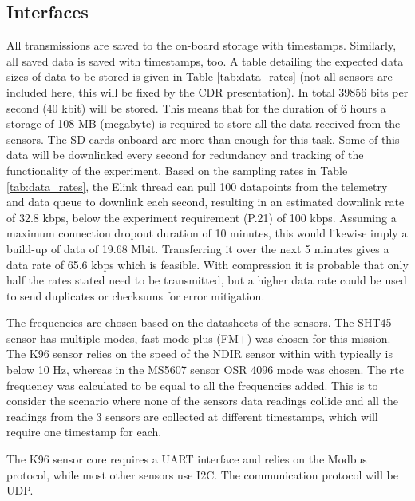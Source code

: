 \subsection{Interfaces}
All transmissions are saved to the on-board storage with timestamps. Similarly, all saved data is saved with timestamps, too. A table detailing the expected data sizes of data to be stored is given in Table \ref{tab:data_rates} (not all sensors are included here, this will be fixed by the CDR presentation). In total 39856 bits per second (40 kbit) will be stored. This means that for the duration of 6 hours a storage of 108 MB (megabyte) is required to store all the data received from the sensors. The SD cards onboard are more than enough for this task. Some of this data will be downlinked every second for redundancy and tracking of the functionality of the experiment. Based on the sampling rates in Table \ref{tab:data_rates}, the Elink thread can pull 100 datapoints from the telemetry and data queue to downlink each second, resulting in an estimated downlink rate of 32.8 kbps, below the experiment requirement (P.21) of 100 kbps. Assuming a maximum connection dropout duration of 10 minutes, this would likewise imply a build-up of data of 19.68 Mbit. Transferring it over the next 5 minutes gives a data rate of 65.6 kbps which is feasible. With compression it is probable that only half the rates stated need to be transmitted, but a higher data rate could be used to send duplicates or checksums for error mitigation.

The frequencies are chosen based on the datasheets of the sensors. The SHT45 sensor has multiple modes, fast mode plus (FM+) was chosen for this mission. The K96 sensor relies on the speed of the NDIR sensor within with typically is below 10 Hz, whereas in the MS5607 sensor OSR 4096 mode was chosen. The \gls{rtc} frequency was calculated to be equal to all the frequencies added. This is to consider the scenario where none of the sensors data readings collide and all the readings from the 3 sensors are collected at different timestamps, which will require one timestamp for each.

The K96 sensor core requires a UART interface and relies on the Modbus protocol, while most other sensors use I2C. The communication protocol will be UDP.

